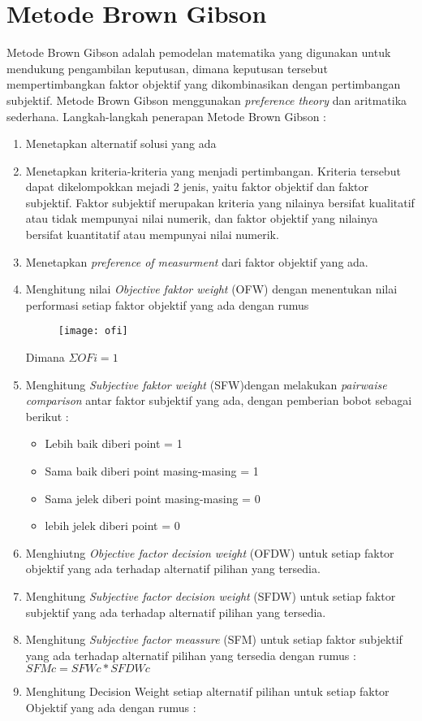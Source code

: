 \section{Metode Brown Gibson}
Metode Brown Gibson adalah pemodelan matematika yang digunakan untuk mendukung pengambilan keputusan, dimana keputusan tersebut mempertimbangkan faktor objektif yang dikombinasikan dengan pertimbangan subjektif. Metode Brown Gibson menggunakan \textit{preference theory} dan aritmatika sederhana.
Langkah-langkah penerapan Metode Brown Gibson :
\begin{enumerate}
	\item Menetapkan alternatif solusi yang ada
	\item Menetapkan kriteria-kriteria yang menjadi pertimbangan. Kriteria tersebut dapat dikelompokkan mejadi 2 jenis, yaitu faktor objektif dan faktor subjektif. Faktor subjektif merupakan kriteria yang nilainya bersifat kualitatif atau tidak mempunyai nilai numerik, dan faktor objektif yang nilainya bersifat kuantitatif atau mempunyai nilai numerik.
	\item Menetapkan \textit{preference of measurment} dari faktor objektif yang ada.	
	\item Menghitung nilai \textit{Objective faktor weight} (OFW) dengan menentukan nilai performasi setiap faktor objektif yang ada dengan rumus 
\begin{figure}[H]
	\centering  
	\texttt{[image: ofi]}   
\end{figure}

Dimana $\Sigma OFi=1$
\item Menghitung \textit{Subjective faktor weight} (SFW)dengan melakukan \textit{pairwaise comparison} antar faktor subjektif yang ada, dengan pemberian bobot sebagai berikut : 
\begin{itemize}
	\item Lebih baik diberi point = 1
	\item Sama baik diberi point masing-masing = 1 
	\item Sama jelek diberi point masing-masing = 0
	\item lebih jelek diberi point = 0
\end{itemize}
\item Menghiutng \textit{Objective factor decision weight} (OFDW) untuk setiap faktor objektif yang ada terhadap alternatif pilihan yang tersedia.
\item Menghitung \textit{Subjective factor decision weight} (SFDW) untuk setiap faktor subjektif yang ada terhadap alternatif pilihan yang tersedia.
\item Menghitung \textit{Subjective factor meassure} (SFM) untuk setiap faktor subjektif yang ada terhadap alternatif pilihan yang tersedia dengan rumus :
$SFMc = SFWc * SFDWc$
\item Menghitung Decision Weight setiap alternatif pilihan untuk setiap faktor Objektif yang ada dengan rumus :


\end{enumerate}
